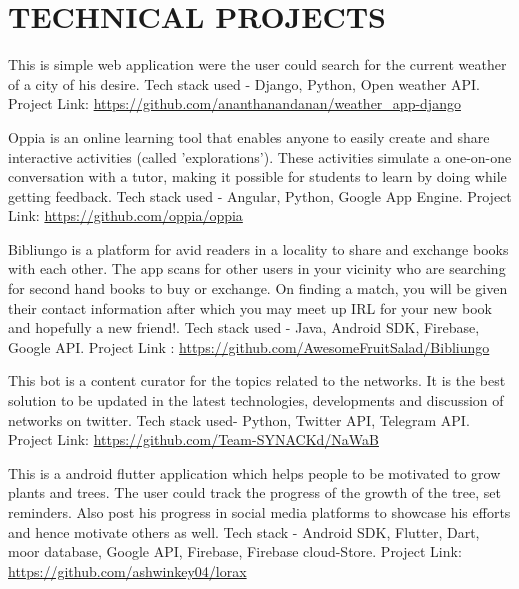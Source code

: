 \documentclass[11pt,a4paper,sans]{moderncv}        %
\begin{document}
\section{TECHNICAL PROJECTS}

{This is simple web application were the user could search for the current weather of a city of his desire. Tech stack used - Django, Python, Open weather API. Project Link: {\newline}
\url{https://github.com/ananthanandanan/weather_app-django}}{}

{Oppia is an online learning tool that enables anyone to easily create and share interactive activities (called 'explorations'). These activities simulate a one-on-one conversation with a tutor, making it possible for students to learn by doing while getting feedback. Tech stack used - Angular, Python, Google App Engine. Project Link: {\newline}
\url{https://github.com/oppia/oppia}}{}

{Bibliungo is a platform for avid readers in a locality to share and exchange books with each other. The app scans for other users in your vicinity who are searching for second hand books to buy or exchange. On finding a match, you will be given their contact information after which you may meet up IRL for your new book and hopefully a new friend!. Tech stack used - Java, Android SDK, Firebase, Google API.
Project Link : {\newline}
\url{https://github.com/AwesomeFruitSalad/Bibliungo}}

{This bot is a content curator for the topics related to the networks. It is the best solution to be updated in the latest technologies, developments and discussion of networks on twitter. Tech stack used- Python, Twitter API, Telegram API. Project Link: {\newline}
\url{https://github.com/Team-SYNACKd/NaWaB}}{}

{This is a android flutter application which helps people to be motivated to grow plants and trees. The user could track the progress of the growth of the tree, set reminders. Also post his progress in social media platforms to showcase his efforts and hence motivate others as well. Tech stack - Android SDK, Flutter, Dart, moor database, Google API, Firebase, Firebase cloud-Store. Project Link: {\newline}
\url{https://github.com/ashwinkey04/lorax}}{}
\end{document}
